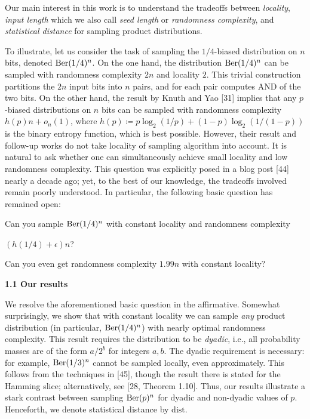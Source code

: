 \documentclass[10pt,a4paper]{article}
\begin{document}
Our main interest in this work is to understand the tradeoffs between \emph{locality}, \emph{input length} which we also call \emph{seed length} or \emph{randomness complexity}, and \emph{statistical distance} for sampling product distributions.\par




To illustrate, let us consider the task of sampling the $1/4$-biased distribution on $n$ bits, denoted $\textnormal{Ber}(1/4)^{n}$.
On the one hand, the distribution $\textnormal{Ber}(1/4)^{n}$ can be sampled with randomness complexity $2n$ and locality $2$. This trivial construction partitions the $2n$ input bits into $n$ pairs, and for each pair computes AND of the two bits.
On the other hand, the result by Knuth and Yao [31] implies that any $p$-biased distributions on $n$ bits can be sampled with randomness complexity $h(p)n+o_{n}(1)$, where $h(p)\coloneq p\log_{2}(1/p)+(1-p)\log_{2}(1/(1-p))$ is the binary entropy function, which is best possible.
However, their result and follow-up works do not take locality of sampling algorithm into account.
It is natural to ask whether one can simultaneously achieve small locality and low randomness complexity. This question was explicitly posed in a blog post [44] nearly a decade ago; yet, to the best of our knowledge, the tradeoffs involved remain poorly understood. In particular, the following basic question has remained open:\par





Can you sample $\textnormal{Ber}(1/4)^{n}$ with constant locality and randomness complexity\par


$(h(1/4)+\epsilon)n$?\par


Can you even get randomness complexity $1.99n$ with constant locality?\par





\par\medskip\noindent\textbf{
1.1 Our results}\par




We resolve the aforementioned basic question in the affirmative. Somewhat surprisingly, we show that with constant locality we can sample \emph{any} product distribution (in particular, $\textnormal{Ber}(1/4)^{n}$) with nearly optimal randomness complexity. This result requires the distribution to be \emph{dyadic}, i.e., all probability masses are of the form $a/2^{b}$ for integers $a,b$. The dyadic requirement is necessary: for example, $\textnormal{Ber}(1/3)^{n}$ cannot be sampled locally, even approximately. This follows from the techniques in [45], though the result there is stated for the Hamming slice; alternatively, see [28, Theorem 1.10].
Thus, our results illustrate a stark contrast between sampling $\textnormal{Ber}(p)^{n}$ for dyadic and non-dyadic values of $p$.
Henceforth, we denote statistical distance by $\mathrm{dist}$.\par
\end{document}
